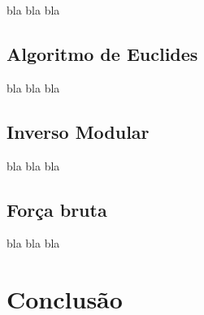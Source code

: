 \documentclass[12pt]{article}
\begin{document}
bla bla bla

\subsection{Algoritmo de Euclides}

bla bla bla

\subsection{Inverso Modular}

bla bla bla

\subsection{Força bruta}

bla bla bla


\section{Conclusão}





\end{document}
